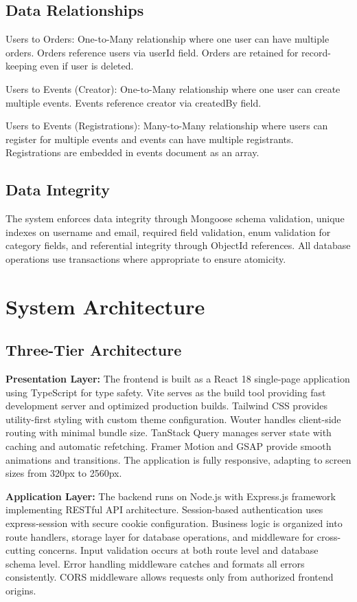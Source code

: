 ﻿\documentclass[11pt]{article}
\begin{document}
\subsection{Data Relationships}
Users to Orders: One-to-Many relationship where one user can have multiple orders. Orders reference users via userId field. Orders are retained for record-keeping even if user is deleted.

Users to Events (Creator): One-to-Many relationship where one user can create multiple events. Events reference creator via createdBy field.

Users to Events (Registrations): Many-to-Many relationship where users can register for multiple events and events can have multiple registrants. Registrations are embedded in events document as an array.

\subsection{Data Integrity}
The system enforces data integrity through Mongoose schema validation, unique indexes on username and email, required field validation, enum validation for category fields, and referential integrity through ObjectId references. All database operations use transactions where appropriate to ensure atomicity.

\section{System Architecture}

\subsection{Three-Tier Architecture}
\textbf{Presentation Layer:} The frontend is built as a React 18 single-page application using TypeScript for type safety. Vite serves as the build tool providing fast development server and optimized production builds. Tailwind CSS provides utility-first styling with custom theme configuration. Wouter handles client-side routing with minimal bundle size. TanStack Query manages server state with caching and automatic refetching. Framer Motion and GSAP provide smooth animations and transitions. The application is fully responsive, adapting to screen sizes from 320px to 2560px.

\textbf{Application Layer:} The backend runs on Node.js with Express.js framework implementing RESTful API architecture. Session-based authentication uses express-session with secure cookie configuration. Business logic is organized into route handlers, storage layer for database operations, and middleware for cross-cutting concerns. Input validation occurs at both route level and database schema level. Error handling middleware catches and formats all errors consistently. CORS middleware allows requests only from authorized frontend origins.
\end{document}
